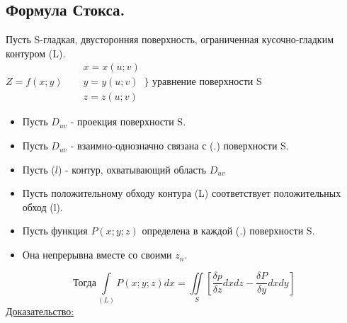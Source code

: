 \documentclass[12pt]{article}
\let\oldint\int
\let\oldiint\iint
\renewcommand{\int}{\oldint\limits}
\renewcommand{\iint}{\oldiint\limits}
\begin{document}
  \subsection{Формула Стокса.}
  Пусть S-гладкая, двусторонняя поверхность, ограниченная кусочно-гладким контуром (L).\\
  $Z=f(x;y) \hspace{20pt}
  \begin{matrix}
    x=x(u;v)\\
    y=y(u;v)\\
    z=z(u;v)
  \end{matrix} \Bigg\}$ уравнение поверхности S\\
  \begin{itemize}
    \item Пусть $D_{uv}$ - проекция поверхности S.
    \item Пусть $D_{uv}$ - взаимно-однозначно связана с (.) поверхности S.
    \item Пусть ($l$) - контур, охватывающий область $D_{uv}$
    \item Пусть положительному обходу контура (L) соответствует положительных обход (l).
    \item Пусть функция $P(x;y;z)$ определена в каждой (.) поверхности S. %
    \item Она непрерывна вместе со своими $z_n$.
  \end{itemize}
  \[\text{Тогда} \int_{(L)}P(x;y;z)dx=\iint_S [\frac{\delta p}{\delta z}dxdz-\frac{\delta P}{\delta y}dxdy]\]
  \underline{Доказательство:}
\end{document}

